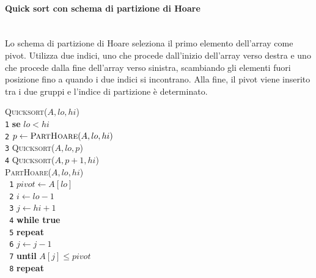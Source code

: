 \documentclass[10pt,landscape]{article}
\newcommand{\myparagraph}[1]{\paragraph{#1}\mbox{}\\ [5pt]}
\begin{document}
\begin{multicols*}{4}
                \myparagraph{Quick sort con schema di partizione di Hoare}
                Lo schema di partizione di Hoare seleziona il primo elemento dell'array come pivot. Utilizza due indici, uno che procede dall'inizio dell'array verso destra e uno che procede dalla fine dell'array verso sinistra, scambiando gli elementi fuori posizione fino a quando i due indici si incontrano. Alla fine, il pivot viene inserito tra i due gruppi e l'indice di partizione è determinato.
                \begin{multicols}{2}
                        \textsc{Quicksort($A, lo, hi$)}\\ [3pt]
                        \verb|1|\hspace*{0.5em} \textbf{se} $lo < hi$\\
                        \verb|2|\hspace*{1.5em} $p \leftarrow \textsc{PartHoare}(A, lo, hi)$\\
                        \verb|3|\hspace*{1.5em} \textsc{Quicksort}($A, lo, p$)\\
                        \verb|4|\hspace*{1.5em} \textsc{Quicksort}($A, p + 1, hi$)\\
                        \columnbreak
                        \textsc{PartHoare($A, lo, hi$)}\\ [3pt]
                        \verb| 1|\hspace*{0.5em} $pivot \leftarrow A[lo]$\\
                        \verb| 2|\hspace*{0.5em} $i \leftarrow lo - 1$\\
                        \verb| 3|\hspace*{0.5em} $j \leftarrow hi + 1$\\
                        \verb| 4|\hspace*{0.5em} \textbf{while true}\\
                        \verb| 5|\hspace*{1.5em} \textbf{repeat}\\
                        \verb| 6|\hspace*{2.5em} $j \leftarrow j - 1$\\
                        \verb| 7|\hspace*{2.5em} \textbf{until} $A[j] \le pivot$\\
                        \verb| 8|\hspace*{1.5em} \textbf{repeat}\\

\end{multicols}
\end{multicols*}
\end{document}
